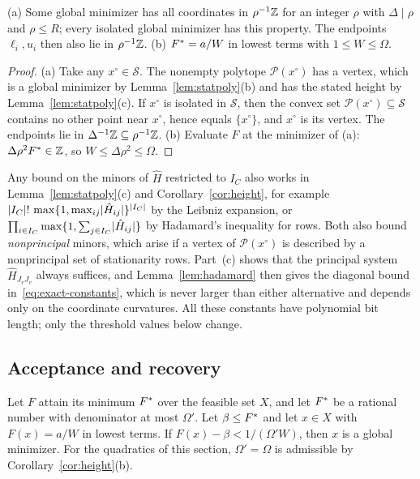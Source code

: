\begin{corollary}\label{cor:height}
(a) Some global minimizer has all coordinates in $\rho^{-1}\mathbb Z$ for an integer
$\rho$ with $\Delta\mid\rho$ and $\rho\le R$; every isolated global minimizer
has this property. The endpoints $\ell_i,u_i$ then also lie in $\rho^{-1}\mathbb Z$.
(b) $F^{*}=a/W$ in lowest terms with $1\le W\le \Omega$.
\end{corollary}

\begin{proof}
(a) Take any $x^\circ\in\mathcal S$. The nonempty polytope $\mathcal P(x^\circ)$ has a
vertex, which is a global minimizer by Lemma~\ref{lem:statpoly}(b) and has
the stated height by Lemma~\ref{lem:statpoly}(c). If $x^\circ$ is isolated in
$\mathcal S$, then the convex set $\mathcal P(x^\circ)\subseteq\mathcal S$ contains
no other point near $x^\circ$, hence equals $\{x^\circ\}$, and $x^\circ$ is its vertex. The
endpoints lie in $\Delta^{-1}\mathbb Z\subseteq\rho^{-1}\mathbb Z$.
(b) Evaluate $F$ at the minimizer of (a): $\Delta\rho^2F^{*}\in\mathbb Z$, so
$W\le \Delta\rho^2\le \Omega$.
\end{proof}

\begin{remark}\label{rem:heights}
Any bound on the minors of $\hat H$ restricted to $I_C$ also works in
Lemma~\ref{lem:statpoly}(c) and Corollary~\ref{cor:height}, for example
$\lvert I_C\rvert!\,\max\{1,\max_{ij}\lvert \hat H_{ij}\rvert\}^{\lvert I_C\rvert}$ by the Leibniz
expansion, or $\prod_{i\in I_C}\max\{1,\sum_{j\in I_C}\lvert \hat H_{ij}\rvert\}$ by
Hadamard's inequality for rows. Both also bound \emph{nonprincipal} minors,
which arise if a vertex of $\mathcal P(x^\circ)$ is described by a nonprincipal set
of stationarity rows. Part~(c) shows that the principal system
$\hat H_{J_vJ_v}$ always suffices, and Lemma~\ref{lem:hadamard} then gives the
diagonal bound in~\eqref{eq:exact-constants}, which is never larger than
either alternative and depends only on the coordinate curvatures. All these
constants have polynomial bit length; only the threshold values below
change.
\end{remark}

\subsection{Acceptance and recovery}\label{sec:exact-accept}

\begin{proposition}\label{prop:accept}
Let $F$ attain its minimum $F^{*}$ over the feasible set $X$, and let $F^{*}$ be
a rational number with denominator at most $\Omega'$. Let $\beta\le F^{*}$ and
let $x\in X$ with $F(x)=a/W$ in lowest terms. If
$F(x)-\beta<1/(\Omega'W)$, then $x$ is a global minimizer. For the quadratics
of this section, $\Omega'=\Omega$ is admissible by
Corollary~\ref{cor:height}(b).
\end{proposition}

